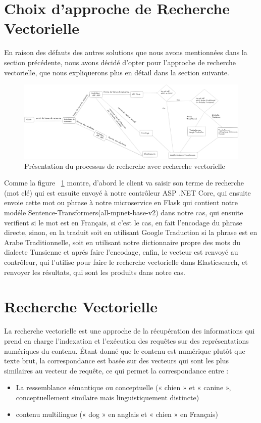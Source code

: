 \section{Choix d'approche de Recherche Vectorielle}
\noindent
En raison des défauts des autres solutions que nous avons mentionnées dans la section précédente, nous avons décidé d'opter pour l'approche de recherche vectorielle, que nous expliquerons plus en détail dans la section suivante.

\begin{figure}[H]
\centering
\includegraphics[width=1\textwidth]{logos/fullprocess.png}
\caption{Présentation du processus de recherche avec recherche vectorielle}
\label{fig:fullprocess}
\end{figure}

\newpage
\noindent
Comme la figure ~\ref{fig:fullprocess} montre, d'abord le client va saisir son terme de recherche (mot clé) qui est ensuite envoyé à notre contrôleur ASP .NET Core, qui ensuite envoie cette mot ou phrase à notre microservice en Flask qui contient notre modéle Sentence-Transformers(all-mpnet-base-v2) dans notre cas, qui ensuite verifient si le mot est en Français, si c'est le cas, en fait l'encodage du phrase directe, sinon, en la traduit soit en utilisant Google Traduction si la phrase est en Arabe Traditionnelle, soit en utilisant notre dictionnaire propre des mots du dialecte Tunsienne et aprés faire l'encodage, enfin, le vecteur est renvoyé au contrôleur, qui l'utilise pour faire le recherche vectorielle dans Elasticsearch, et renvoyer les résultats, qui sont les produits dans notre cas.


\section{Recherche Vectorielle}
\noindent
La recherche vectorielle est une approche de la récupération des informations qui prend en charge l’indexation et l’exécution des requêtes sur des représentations numériques du contenu. Étant donné que le contenu est numérique plutôt que texte brut, la correspondance est basée sur des vecteurs qui sont les plus similaires au vecteur de requête, ce qui permet la correspondance entre :
\begin{itemize}
    \item La ressemblance sémantique ou conceptuelle (« chien » et « canine », conceptuellement similaire mais linguistiquement distincte)
    
    \item contenu multilingue (« dog » en anglais et « chien » en Français)
\end{itemize}

